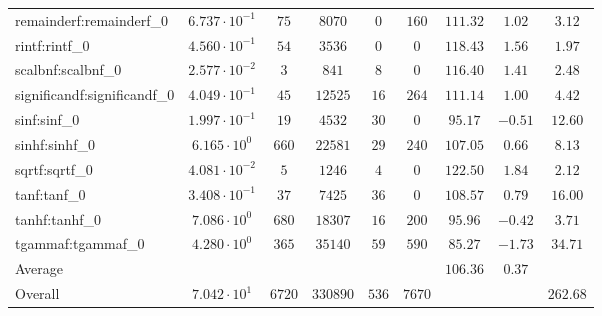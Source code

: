 \begin{tabular}{|l|c|c|c|c|c|c|c|c|}
remainderf:remainderf\_0     & $ 6.737 \cdot 10^{-1} $ & $ 75     $ & $ 8070   $ & $ 0   $ & $ 160  $ & $ 111.32      $ & $ 1.02    $ & $ 3.12    $ \\
rintf:rintf\_0               & $ 4.560 \cdot 10^{-1} $ & $ 54     $ & $ 3536   $ & $ 0   $ & $ 0    $ & $ 118.43      $ & $ 1.56    $ & $ 1.97    $ \\
scalbnf:scalbnf\_0           & $ 2.577 \cdot 10^{-2} $ & $ 3      $ & $ 841    $ & $ 8   $ & $ 0    $ & $ 116.40      $ & $ 1.41    $ & $ 2.48    $ \\
significandf:significandf\_0 & $ 4.049 \cdot 10^{-1} $ & $ 45     $ & $ 12525  $ & $ 16  $ & $ 264  $ & $ 111.14      $ & $ 1.00    $ & $ 4.42    $ \\
sinf:sinf\_0                 & $ 1.997 \cdot 10^{-1} $ & $ 19     $ & $ 4532   $ & $ 30  $ & $ 0    $ & $ 95.17       $ & $ -0.51   $ & $ 12.60   $ \\
sinhf:sinhf\_0               & $ 6.165 \cdot 10^{0}  $ & $ 660    $ & $ 22581  $ & $ 29  $ & $ 240  $ & $ 107.05      $ & $ 0.66    $ & $ 8.13    $ \\
sqrtf:sqrtf\_0               & $ 4.081 \cdot 10^{-2} $ & $ 5      $ & $ 1246   $ & $ 4   $ & $ 0    $ & $ 122.50      $ & $ 1.84    $ & $ 2.12    $ \\
tanf:tanf\_0                 & $ 3.408 \cdot 10^{-1} $ & $ 37     $ & $ 7425   $ & $ 36  $ & $ 0    $ & $ 108.57      $ & $ 0.79    $ & $ 16.00   $ \\
tanhf:tanhf\_0               & $ 7.086 \cdot 10^{0}  $ & $ 680    $ & $ 18307  $ & $ 16  $ & $ 200  $ & $ 95.96       $ & $ -0.42   $ & $ 3.71    $ \\
tgammaf:tgammaf\_0           & $ 4.280 \cdot 10^{0}  $ & $ 365    $ & $ 35140  $ & $ 59  $ & $ 590  $ & $ 85.27       $ & $ -1.73   $ & $ 34.71   $ \\
\hline
Average                      & $                     $ & $        $ & $        $ & $     $ & $      $ & $ 106.36      $ & $ 0.37    $ & $         $ \\
\hline
Overall                      & $ 7.042 \cdot 10^{1}  $ & $ 6720   $ & $ 330890 $ & $ 536 $ & $ 7670 $ & $             $ & $         $ & $ 262.68  $ \\
\hline
\end{tabular}
